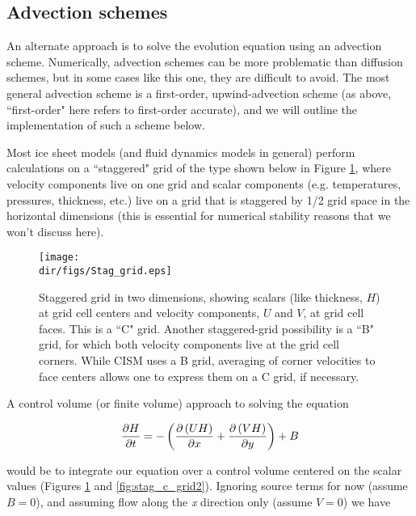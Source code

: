 \subsection{Advection schemes}
An alternate approach is to solve the evolution equation using an advection scheme. Numerically, advection schemes can be more problematic than diffusion schemes, but in some cases like this one, they are difficult to avoid. The most general advection scheme is a first-order, upwind-advection scheme (as above, ``first-order" here refers to first-order accurate), and we will outline the implementation of such a scheme below.

Most ice sheet models (and fluid dynamics models in general) perform calculations on a ``staggered" grid of the type shown below in Figure \ref{fig:stag_c_grid}, where velocity components live on one grid and scalar components (e.g. temperatures, pressures, thickness, etc.) live on a grid that is staggered by 1/2 grid space in the horizontal dimensions (this is essential for numerical stability reasons that we won't discuss here).

\begin{figure}
  \begin{center}
    \texttt{[image: \\dir/figs/Stag\_grid.eps]}
  \end{center}
\caption{Staggered grid in two dimensions, showing scalars (like thickness, $H$) at grid cell centers and velocity components, $U$ and $V$, at grid cell faces. This is a ``C" grid. Another staggered-grid possibility is a ``B" grid, for which both velocity components live at the grid cell corners. While CISM uses a B grid, averaging of corner velocities to face centers allows one to express them on a C grid, if necessary.}
  \label{fig:stag_c_grid}
\end{figure} 

A control volume (or finite volume) approach to solving the equation 

\begin{equation}
\frac{\partial H}{\partial t}=-\left( \frac{\partial \left( UH \right)}{\partial x}+\frac{\partial \left( VH \right)}{\partial y} \right)+B \\ 
\end{equation}

would be to integrate our equation over a control volume centered on the scalar values (Figures \ref{fig:stag_c_grid} and \ref{fig:stag_c_grid2}). Ignoring source terms for now (assume $B=0$), and assuming flow along the \textit{x} direction only (assume $V=0$) we have

